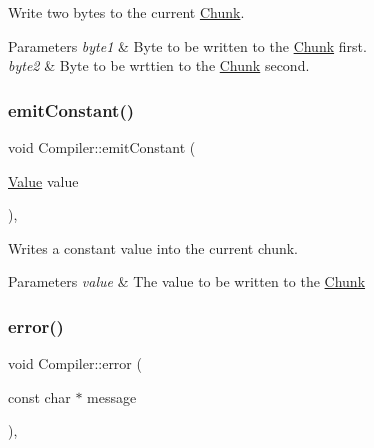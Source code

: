 Write two bytes to the current \hyperlink{class_chunk}{Chunk}. 


\begin{DoxyParams}{Parameters}
{\em byte1} & Byte to be written to the \hyperlink{class_chunk}{Chunk} first. \\
\hline
{\em byte2} & Byte to be wrttien to the \hyperlink{class_chunk}{Chunk} second. \\
\hline
\end{DoxyParams}
\mbox{\label{class_compiler_a2c44111e9882723961bc65bf1c4a5b51}} 
\subsubsection{\texorpdfstring{emit\+Constant()}{emitConstant()}}
{\footnotesize\ttfamily void Compiler\+::emit\+Constant (\begin{DoxyParamCaption}\item[{\hyperlink{class_value}{Value}}]{value }\end{DoxyParamCaption})\hspace{0.3cm}{\ttfamily [inline]}, {\ttfamily [private]}}



Writes a constant value into the current chunk. 


\begin{DoxyParams}{Parameters}
{\em value} & The value to be written to the \hyperlink{class_chunk}{Chunk} \\
\hline
\end{DoxyParams}
\mbox{\label{class_compiler_ab7a1badde3752ab4c9e756c9781cab12}} 
\subsubsection{\texorpdfstring{error()}{error()}}
{\footnotesize\ttfamily void Compiler\+::error (\begin{DoxyParamCaption}\item[{const char $\ast$}]{message }\end{DoxyParamCaption})\hspace{0.3cm}{\ttfamily [inline]}, {\ttfamily [private]}}



